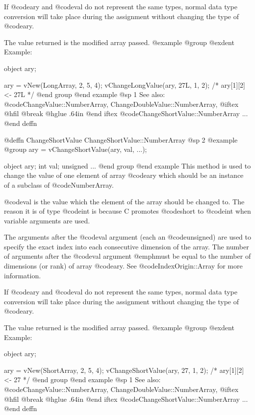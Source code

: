 If @code{ary} and @code{val} do not represent the same types, normal
data type conversion will take place during the assignment without
changing the type of @code{ary}.

The value returned is the modified array passed.
@example
@group
@exdent Example:

object  ary;

ary = vNew(LongArray, 2, 5, 4);
vChangeLongValue(ary, 27L, 1, 2);
/*  ary[1][2] <- 27L  */
@end group
@end example
@sp 1
See also:  @code{ChangeValue::NumberArray, ChangeDoubleValue::NumberArray,}
@iftex
@hfil @break @hglue .64in 
@end iftex
@code{ChangeShortValue::NumberArray}  ...
@end deffn









@deffn {ChangeShortValue} ChangeShortValue::NumberArray
@sp 2
@example
@group
ary = vChangeShortValue(ary, val, ...);

object    ary;
int       val;
unsigned  ...
@end group
@end example
This method is used to change the value of one element of
array @code{ary} which should be an instance of a subclass of
@code{NumberArray}.

@code{val} is the value which the element of the array should be changed
to.  The reason it is of type @code{int} is because C promotes @code{short}
to @code{int} when variable arguments are used.

The arguments after the @code{val} argument (each an @code{unsigned})
are used to specify the exact index into each consecutive dimension of
the array.  The number of arguments after the @code{val} argument
@emph{must} be equal to the number of dimensions (or rank) of array
@code{ary}.  See @code{IndexOrigin::Array} for more information.

If @code{ary} and @code{val} do not represent the same types, normal
data type conversion will take place during the assignment without
changing the type of @code{ary}.

The value returned is the modified array passed.
@example
@group
@exdent Example:

object  ary;

ary = vNew(ShortArray, 2, 5, 4);
vChangeShortValue(ary, 27, 1, 2);
/*  ary[1][2] <- 27  */
@end group
@end example
@sp 1
See also:  @code{ChangeValue::NumberArray, ChangeDoubleValue::NumberArray,}
@iftex
@hfil @break @hglue .64in 
@end iftex
@code{ChangeShortValue::NumberArray}  ...
@end deffn








